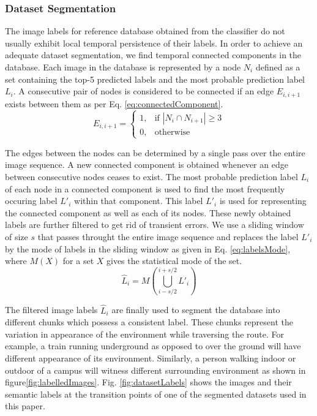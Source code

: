 \documentclass[letterpaper, 10 pt, conference]{ieeeconf}  %
\begin{document}
\subsubsection{Dataset Segmentation}
The image labels for reference database obtained from the classifier do not usually exhibit local temporal persistence of their labels. In order to achieve an adequate dataset segmentation, we find temporal connected components in the database. Each image in the database is represented by a node $N_i$ defined as a set containing the top-5 predicted labels and the most probable prediction label $L_i$. A consecutive pair of nodes is considered to be connected if an edge $E_{i,i+1}$ exists between them as per Eq. \ref{eq:connectedComponent}.
\begin{equation}
 E_{i,i+1} = 
 \begin{cases}
  1, & \text{if } \left\vert{N_i \cap N_{i+1}}\right\vert \geq 3\\
  0, & \text{otherwise}
 \end{cases}
 \label{eq:connectedComponent}
\end{equation}

The edges between the nodes can be determined by a single pass over the entire image sequence. A new connected component is obtained whenever an edge between consecutive nodes ceases to exist. The most probable prediction label $L_i$ of each node in a connected component is used to find the most frequently occuring label $L'_i$ within that component. This label $L'_i$ is used for representing the connected component as well as each of its nodes. These newly obtained labels are further filtered to get rid of transient errors. We use a sliding window of size $s$ that passes throught the entire image sequence and replaces the label $L'_i$ by the mode of labels in the sliding window as given in Eq. \ref{eq:labelsMode}, where $M(X)$ for a set $X$ gives the statistical mode of the set.
\begin{equation}
 \hat{L}_i = M(\bigcup\limits_{i-s/2}^{i+s/2} L'_i)
 \label{eq:labelsMode}
\end{equation}

The filtered image labels $\hat{L}_i$ are finally used to segment the database into different chunks which possess a consistent label. These chunks represent the variation in appearance of the environment while traversing the route. For example, a train running underground as opposed to over the ground will have different appearance of its environment. Similarly, a person walking indoor or outdoor of a campus will witness different surrounding environment as shown in figure\ref{fig:labelledImages}. Fig. \ref{fig:datasetLabels} shows the images and their semantic labels at the transition points of one of the segmented datasets used in this paper.
\end{document}
